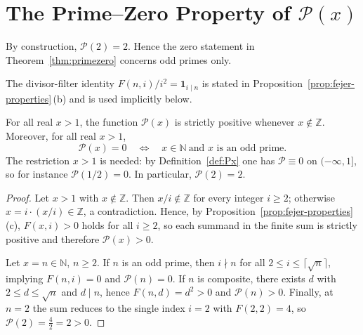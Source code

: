 \section{The Prime–Zero Property of $\mathcal{P}(x)$}

\begin{remark}
By construction, $\mathcal P(2)=2$. Hence the zero statement in Theorem~\ref{thm:primezero} concerns odd primes only.
\end{remark}

\noindent The divisor-filter identity $F(n,i)/i^2=\mathbf{1}_{i\mid n}$ is stated in Proposition~\ref{prop:fejer-properties}\,(b) and is used implicitly below.

\begin{theorem}\label{thm:primezero}
For all real $x>1$, the function $\mathcal P(x)$ is strictly positive whenever $x\notin\mathbb Z$. Moreover, for all real $x>1$,
\[
\mathcal P(x)=0\quad\Longleftrightarrow\quad x\in\mathbb N\ \text{and $x$ is an odd prime}.
\]
The restriction $x>1$ is needed: by Definition~\ref{def:Px} one has $\mathcal P\equiv0$ on $(-\infty,1]$, so for instance $\mathcal P(1/2)=0$.
In particular, $\mathcal P(2)=2$.
\end{theorem}
\begin{proof}
Let $x>1$ with $x\notin\mathbb Z$. Then $x/i\notin\mathbb Z$ for every integer $i\ge 2$; otherwise $x=i\cdot (x/i)\in\mathbb Z$, a contradiction. Hence, by Proposition~\ref{prop:fejer-properties}(c), $F(x,i)>0$ holds for all $i\ge 2$, so each summand in the finite sum is strictly positive and therefore $\mathcal P(x)>0$.

Let $x=n\in\mathbb N$, $n\ge 2$. If $n$ is an odd prime, then $i\nmid n$ for all $2\le i\le \lceil\sqrt n\rceil$, implying $F(n,i)=0$ and $\mathcal P(n)=0$. If $n$ is composite, there exists $d$ with $2\le d\le \sqrt n$ and $d\mid n$, hence $F(n,d)=d^2>0$ and $\mathcal P(n)>0$. Finally, at $n=2$ the sum reduces to the single index $i=2$ with $F(2,2)=4$, so $\mathcal P(2)=\frac{4}{2}=2>0$.
\end{proof}

